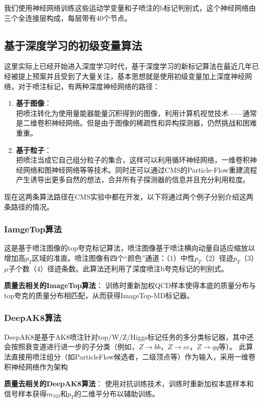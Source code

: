 我们使用神经网络训练这些运动学变量和子喷注的b标记判别式，这个神经网络由三个全连接层构成，每层带有40个节点。
\subsection{基于深度学习的初级变量算法}
这里实际上已经开始进入深度学习时代，基于深度学习的新标记算法在最近几年已经被提上预案并且受到了大量关注，基本思想就是使用初级变量加上深度神经网络，对于喷注标记，有两种深度神经网络的路径：
\begin{enumerate}
    \item \textbf{基于图像}：\label{dl:image}\\
    把喷注转化为使用量能器能量沉积得到的图像，利用计算机视觉技术——通常是二维卷积神经网络。但是由于图像的稀疏性和异构探测器，仍然挑战和困难重重。
    \item \textbf{基于粒子}：\label{dl:particle}\\
    把喷注当成它自己组分粒子的集合，这样可以利用循环神经网络，一维卷积神经网络和图神经网络等等技术。同时还可以通过CMS的Particle-Flow重建流程产生诱导出更多自然的想法，合并所有子探测器的信息并且充分利用粒度。
\end{enumerate}

现在这两条算法路径在CMS实验中都在开发，以下将通过两个例子分别介绍这两条路径的情况。
\subsubsection{IamgeTop算法}
这是基于喷注图像的top夸克标记算法，喷注图像基于喷注横向动量自适应缩放以
增加高$p_T$区域的准直。喷注图像有四个“颜色”通道：（1）中性$p_T$（2）径迹$p_T$（3）$\mu$子个数（4）径迹条数。此算法还利用了深度喷注b夸克标记的判别式。

\textbf{质量去相关的ImageTop算法}：
训练时重新加权QCD样本使得本底的质量分布与top夸克的质量分布相匹配，从而获得ImageTop-MD标记器。
\subsubsection{DeepAK8算法}
DeepAK8是基于AK8喷注针对top/W/Z/Higgs标记任务的多分类标记器，其中还会按照衰变道进行进一步的子分类（例如，$Z\to bb$，$Z\to cc$，$Z\to qq$等）。
此算法直接用喷注组分（如ParticleFlow候选者，二级顶点等）作为输入，采用一维卷积神经网络作为架构

\textbf{质量去相关的DeepAK8算法}：
使用对抗训练技术，训练时重新加权本底样本和信号样本获得$m_{SD}$和$p_T$的二维平分布以辅助训练。